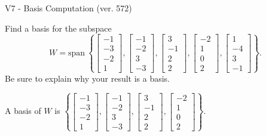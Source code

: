 \begin{exercise}
  \begin{exerciseTitle}V7 - Basis Computation (ver. 572)\end{exerciseTitle}
  \begin{exerciseStatement}
    Find a basis for the subspace 
\[W=\mathrm{span}\ \left\{\left[\begin{array}{r}
-1 \\
-3 \\
-2 \\
1
\end{array}\right] , \left[\begin{array}{r}
-1 \\
-2 \\
3 \\
-3
\end{array}\right] , \left[\begin{array}{r}
3 \\
-1 \\
2 \\
2
\end{array}\right] , \left[\begin{array}{r}
-2 \\
1 \\
0 \\
2
\end{array}\right] , \left[\begin{array}{r}
1 \\
-4 \\
3 \\
-1
\end{array}\right]\right\}.\]
 Be sure to explain why your result is a basis.


  \end{exerciseStatement}
  \begin{exerciseAnswer}
   A basis of \(W\) is  \(\left\{\left[\begin{array}{r}
-1 \\
-3 \\
-2 \\
1
\end{array}\right] , \left[\begin{array}{r}
-1 \\
-2 \\
3 \\
-3
\end{array}\right] , \left[\begin{array}{r}
3 \\
-1 \\
2 \\
2
\end{array}\right] , \left[\begin{array}{r}
-2 \\
1 \\
0 \\
2
\end{array}\right]\right\}\).
  


  \end{exerciseAnswer}
\end{exercise}